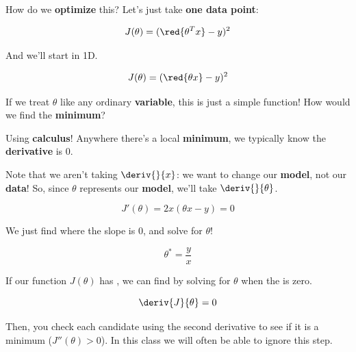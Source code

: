         How do we \textbf{optimize} this? Let's just take \textbf{one data point}:
        
        \begin{equation}
            J(\theta) = (\red{ \theta^T x  } - y )^2
        \end{equation}
        
        And we'll start in 1D.
        
        \begin{equation}
            J(\theta) = (\red{\theta x}   - y )^2
        \end{equation}
        
        If we treat $\theta$ like any ordinary \textbf{variable}, this is just a simple function! How would we find the \textbf{minimum}? 
        
        Using \textbf{calculus}! Anywhere there's a local \textbf{minimum}, we typically know the \textbf{derivative} is 0.
        
        Note that we aren't taking $\deriv{}{x}$: we want to change our \textbf{model}, not our \textbf{data}! So, since $\theta$ represents our \textbf{model}, we'll take $\deriv{}{\theta}$.
        
        \begin{equation}
            J'(\theta) = 2x(\theta x - y ) = 0
        \end{equation}
        
        We just find where the slope is 0, and solve for $\theta$!
        
        \begin{equation}
            \theta^* = \frac{y}{x}
        \end{equation}
        
        \begin{concept}
            
            If our function $J(\theta)$ has , we can  find  by solving for $\theta$ when the  is zero.
            
            \begin{equation*}
                \deriv{J}{\theta}=0
            \end{equation*}
            
            Then, you check each candidate using the second derivative to see if it is a minimum ($J''(\theta)>0$). In this class we will often be able to ignore this step.
        \end{concept}
        
